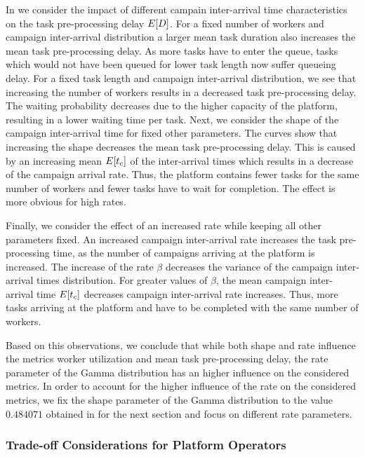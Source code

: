 In  we consider the impact of different campain inter-arrival time characteristics on the task pre-processing delay \(E[D]\).
For a fixed number of workers and campaign inter-arrival distribution a larger mean task duration also increases the mean task pre-processing delay. 
As more tasks have to enter the queue, tasks which would not have been queued for lower task length now suffer queueing delay.
For a fixed task length and campaign inter-arrival distribution, we see that increasing the number of workers results in a decreased task pre-processing delay.
The waiting probability decreases due to the higher capacity of the platform, resulting in a lower waiting time per task.
Next, we consider the shape of the campaign inter-arrival time for fixed other parameters. 
The curves show that increasing the shape decreases the mean task pre-processing delay. 
This is caused by an increasing mean \(E[t_c]\) of the inter-arrival times which results in a decrease of the campaign arrival rate.
Thus, the platform contains fewer tasks for the same number of workers and fewer tasks have to wait for completion.
The effect is more obvious for high rates.

Finally, we consider the effect of an increased rate while keeping all other parameters fixed.
An increased campaign inter-arrival rate increases the task pre-processing time, as the number of campaigns arriving at the platform is increased.
The increase of the rate \(\beta\) decreases the variance of the campaign inter-arrival times distribution.
For greater values of \(\beta\), the mean campaign inter-arrival time \(E[t_c]\) decreases campaign inter-arrival rate increases. 
Thus, more tasks arriving at the platform and have to be completed with the same number of workers.

Based on this observations, we conclude that while both shape and rate influence the metrics worker utilization and mean task pre-processing delay, the rate parameter of the Gamma distribution has an higher influence on the considered metrics.
In order to account for the higher influence of the rate on the considered metrics, we fix the shape parameter of the Gamma distribution to the value \(0.484071\) obtained in  for the next section and focus on different rate parameters.

\subsubsection*{Trade-off Considerations for Platform Operators}

